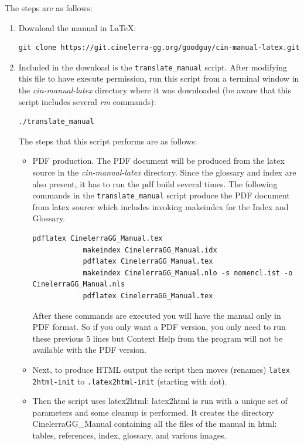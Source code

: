 The steps are as follows:
\begin{enumerate}
	\item Download the manual in LaTeX:

\begin{lstlisting}[style=sh]
git clone https://git.cinelerra-gg.org/goodguy/cin-manual-latex.git
\end{lstlisting}

	\item Included in the download is the \texttt{translate\_manual} script. After modifying this file to have execute permission, run this script from a terminal window in the \textit{cin-manual-latex} directory where it was downloaded (be aware that this script includes several \textit{rm} commands):
\begin{lstlisting}[style=sh]
./translate_manual
\end{lstlisting}

	The steps that this script performs are as follows:
	\begin{itemize}
		\item PDF production. The PDF document will be produced from the latex source in the \textit{cin-manual-latex} directory. Since the glossary and index are also present, it has to run the pdf build several times. The following commands in the \texttt{translate\_manual} script produce the PDF document from latex source which includes invoking makeindex for the Index and Glossary.
		
		\begin{lstlisting}[style=sh]
			pdflatex CinelerraGG_Manual.tex
			makeindex CinelerraGG_Manual.idx
			pdflatex CinelerraGG_Manual.tex
			makeindex CinelerraGG_Manual.nlo -s nomencl.ist -o CinelerraGG_Manual.nls
			pdflatex CinelerraGG_Manual.tex
		\end{lstlisting}
		
		After these commands are executed you will have the manual only in PDF format.  So if you only want a PDF version, you only need to run these previous 5 lines but Context Help from the program will not be available with the PDF version.
		\item Next, to produce HTML output the script then moves (renames) \texttt{latex 2html-init} to \texttt{.latex2html-init} (starting with dot).
		
		\item Then the script uses latex2html: latex2html is run with a unique set of parameters and some cleanup is performed. It creates the directory CinelerraGG\_Manual containing all the files of the manual in html:  tables, references, index, glossary, and various images.
	\end{itemize}


\end{enumerate}
